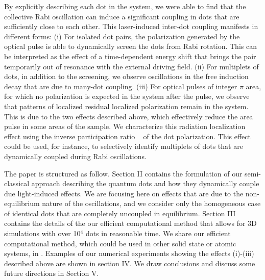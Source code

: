 By explicitly describing each  dot  in the system, we were able to find that the collective Rabi oscillation can induce a significant coupling in dots that are sufficiently close to each other. This laser-induced inter-dot  coupling manifests in different forms: (i) For isolated dot pairs, the  polarization generated by the optical pulse is able to dynamically screen the dots from Rabi rotation. This can be interpreted as the effect of a time-dependent energy shift that brings the pair temporarily out of resonance with the external driving field. (ii) For multiplets of dots, in addition to the screening, we observe  oscillations in the free induction decay that are due to many-dot coupling. (iii) For optical pulses of integer $\pi$ area, for which no polarization is expected in the system after the pulse,  we observe that patterns of  localized residual localized polarization remain in the system. This is due to the two effects described above, which effectively reduce the area pulse in some areas of the sample.  We characterize this radiation localization effect using the inverse participation ratio ~\cite{Schwartz2007}  of the dot polarization. This effect could be used, for instance, to selectively identify multiplets of dots that are dynamically coupled during Rabi oscillations.

The paper is structured as follow. Section II contains the formulation of our semi-classical approach  describing the quantum dots and how they  dynamically couple due light-induced effects. We are focusing here on effects that are due to the non-equilibrium nature of the oscillations, and we consider only the homogeneous case of identical dots that are completely uncoupled in equilibrium. Section III contains the details of the our efficient computational method that allows for 3D simulations with over 10$^4$ dots in  reasonable  time.  We share our efficient computational method, which could be used in other solid state or atomic systems, in \cite{githubpage}. Examples of our numerical experiments  showing the effects (i)-(iii) described above are shown in section IV.  We draw conclusions and discuss some future directions in Section V.  


